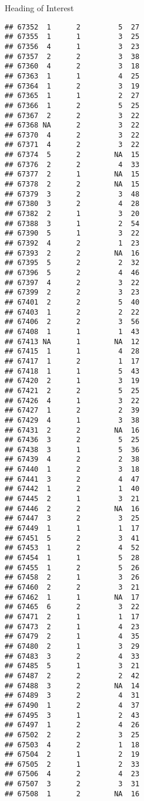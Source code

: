 \documentclass[
  ignorenonframetext,
]{beamer}
\begin{document}
\begin{frame}[fragile]{Heading of Interest}
\begin{verbatim}
## 67352  1      2         5  27
## 67355  1      1         3  25
## 67356  4      1         3  23
## 67357  2      2         3  38
## 67360  4      2         3  18
## 67363  1      1         4  25
## 67364  1      2         3  19
## 67365  1      1         2  27
## 67366  1      2         5  25
## 67367  2      2         3  22
## 67368 NA      2         3  22
## 67370  4      2         3  22
## 67371  4      2         3  22
## 67374  5      2        NA  15
## 67376  2      2         4  33
## 67377  2      1        NA  15
## 67378  2      2        NA  15
## 67379  3      2         3  48
## 67380  3      2         4  28
## 67382  2      1         3  20
## 67388  3      1         2  54
## 67390  5      1         3  22
## 67392  4      2         1  23
## 67393  2      2        NA  16
## 67395  5      2         2  32
## 67396  5      2         4  46
## 67397  4      2         3  22
## 67399  2      2         3  23
## 67401  2      2         5  40
## 67403  1      2         2  22
## 67406  2      2         3  56
## 67408  1      1         1  43
## 67413 NA      1        NA  12
## 67415  1      1         4  28
## 67417  1      2         1  17
## 67418  1      1         5  43
## 67420  2      1         3  19
## 67421  2      2         5  25
## 67426  4      1         3  22
## 67427  1      2         2  39
## 67429  4      1         3  38
## 67431  2      2        NA  16
## 67436  3      2         5  25
## 67438  3      1         5  36
## 67439  4      2         2  38
## 67440  1      2         3  18
## 67441  3      2         4  47
## 67442  1      2         1  40
## 67445  2      1         3  21
## 67446  2      2        NA  16
## 67447  3      2         3  25
## 67449  1      1         1  17
## 67451  5      2         3  41
## 67453  1      2         4  52
## 67454  1      1         5  28
## 67455  1      2         5  26
## 67458  2      1         3  26
## 67460  2      2         3  21
## 67462  1      1        NA  17
## 67465  6      2         3  22
## 67471  2      1         1  17
## 67473  2      1         4  23
## 67479  2      1         4  35
## 67480  2      1         3  29
## 67483  3      2         4  33
## 67485  5      1         3  21
## 67487  2      2         2  42
## 67488  3      2        NA  14
## 67489  3      2         4  31
## 67490  1      2         4  37
## 67495  3      1         2  43
## 67497  1      2         4  26
## 67502  2      2         3  25
## 67503  4      2         1  18
## 67504  2      1         2  19
## 67505  2      1         2  33
## 67506  4      2         4  23
## 67507  3      2         3  31
## 67508  1      2        NA  16

\end{verbatim}
\end{frame}
\end{document}
